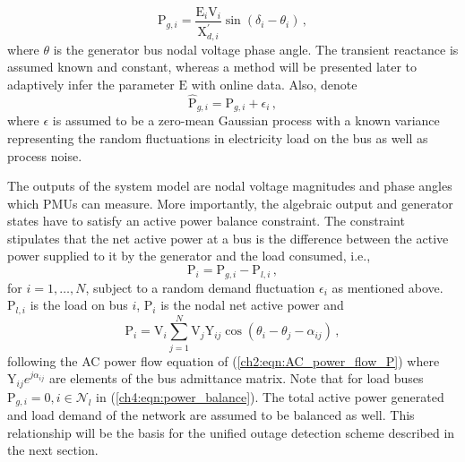 \begin{equation}
\label{ch4:eqn:ae_continuous}
\text{P}_{g, i} = \frac{\text{E}_i\text{V}_i}{\text{X}_{d, i}^{'}}\sin (\delta_i - \theta_i)\,,
\end{equation}
where $\theta$ is the generator bus nodal voltage phase angle. The transient reactance is assumed known and constant, whereas a method will be presented later to adaptively infer the parameter $\text{E}$ with online data. Also, denote 
$$
\hat{\text{P}}_{g, i} = \text{P}_{g, i} + \epsilon_i \,,
$$
where $\epsilon$ is assumed to be a zero-mean Gaussian process with a known variance representing the random fluctuations in electricity load on the bus as well as process noise. 

The outputs of the system model are nodal voltage magnitudes and phase angles which PMUs can measure. More importantly, the algebraic output and generator states have to satisfy an active power balance constraint. The constraint stipulates that the net active power at a bus is the difference between the active power supplied to it by the generator and the load consumed, i.e.,
\begin{equation}
\label{ch4:eqn:power_balance}
\text{P}_i = \text{P}_{g, i} - \text{P}_{l, i} \,,
\end{equation}
for $i = 1, \dots, N$, subject to a random demand fluctuation $\epsilon_i$ as mentioned above. $\text{P}_{l, i}$ is the load on bus $i$, $\text{P}_{i}$ is the nodal net active power and 
\begin{equation}
\label{ch4:eqn:ac_pf}
\text{P}_{i} = \text{V}_i \sum_{j=1}^{N} \text{V}_j \text{Y}_{ij} \cos (\theta_i - \theta_j - \alpha_{ij}) \,,
\end{equation} following the AC power flow equation of (\ref{ch2:eqn:AC_power_flow_P}) where $\text{Y}_{ij}e^{j\alpha_{ij}}$ are elements of the bus admittance matrix. Note that for load buses $\text{P}_{g, i} = 0, i \in \mathcal{N}_l$ in (\ref{ch4:eqn:power_balance}). The total active power generated and load demand of the network are assumed to be balanced as well. This relationship will be the basis for the unified outage detection scheme described in the next section. 


